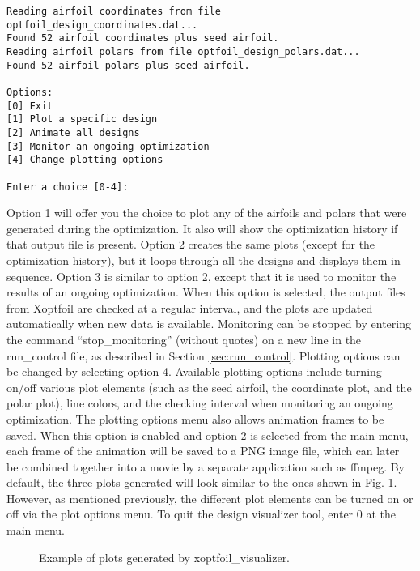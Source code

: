 \documentclass[11pt]{article}
\begin{document}
\begin{verbatim}
Reading airfoil coordinates from file optfoil_design_coordinates.dat...
Found 52 airfoil coordinates plus seed airfoil.
Reading airfoil polars from file optfoil_design_polars.dat...
Found 52 airfoil polars plus seed airfoil.

Options:
[0] Exit
[1] Plot a specific design
[2] Animate all designs 
[3] Monitor an ongoing optimization
[4] Change plotting options

Enter a choice [0-4]: 
\end{verbatim}

Option 1 will offer you the choice to plot any of the airfoils and polars that were
generated during the optimization. It also will show the optimization history if that
output file is present. Option 2 creates the same plots (except for the optimization 
history), but it loops through all the designs and displays them in sequence. Option 3 is
similar to option 2, except that it is used to monitor the results of an ongoing
optimization. When this option is selected, the output files from Xoptfoil are checked at
a regular interval, and the plots are updated automatically when new data is available. 
Monitoring can be stopped by entering the command ``stop\_monitoring'' (without quotes) on
a new line in the run\_control file, as described in Section \ref{sec:run_control}.
Plotting options can be 
changed by selecting option 4.  Available plotting options include turning on/off various
plot elements (such as the seed airfoil, the coordinate  plot, and the polar plot), line 
colors, and the checking interval when monitoring an ongoing optimization.  The plotting 
options menu also allows animation frames to be saved. When this option is enabled and 
option 2 is selected from the main menu, each frame of the animation will be saved to a
PNG image file, which can later be combined together into a movie by a separate
application such as ffmpeg.  By default, the three plots generated  will look similar to 
the ones shown in Fig. \ref{fig:visualizer_plot}.  However, as mentioned
previously, the different plot elements can be turned on or off via the plot options menu.
To quit the design visualizer tool, enter 0 at the main menu.

\begin{figure}
\centering

\caption{Example of plots generated by xoptfoil\_visualizer.}
\label{fig:visualizer_plot}
\end{figure}
\end{document}

